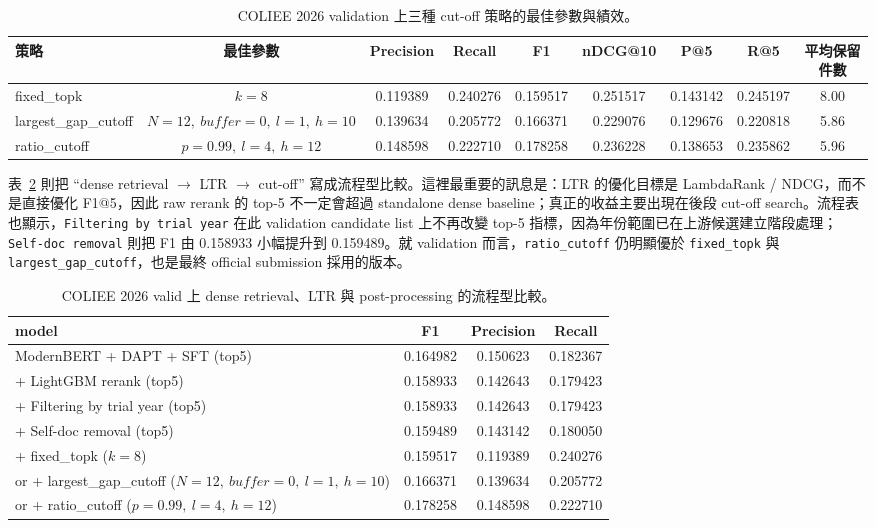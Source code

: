 \begin{table}[t]
  \centering
  \scriptsize
  \begin{tabular}{lcccccccc}
    \toprule
    策略 & 最佳參數 & Precision & Recall & F1 & nDCG@10 & P@5 & R@5 & 平均保留件數 \\
    \midrule
    fixed\_topk & $k=8$ & 0.119389 & 0.240276 & 0.159517 & 0.251517 & 0.143142 & 0.245197 & 8.00 \\
    largest\_gap\_cutoff & $N=12,\ buffer=0,\ l=1,\ h=10$ & 0.139634 & 0.205772 & 0.166371 & 0.229076 & 0.129676 & 0.220818 & 5.86 \\
    ratio\_cutoff & $p=0.99,\ l=4,\ h=12$ & 0.148598 & 0.222710 & 0.178258 & 0.236228 & 0.138653 & 0.235862 & 5.96 \\
    \bottomrule
  \end{tabular}
  \caption{COLIEE 2026 validation 上三種 cut-off 策略的最佳參數與績效。}
  \label{tab:cutoff-strategies}
\end{table}

表~\ref{tab:ltr-pipeline-progression} 則把 ``dense retrieval $\rightarrow$ LTR $\rightarrow$ cut-off'' 寫成流程型比較。這裡最重要的訊息是：LTR 的優化目標是 LambdaRank / NDCG，而不是直接優化 F1@5，因此 raw rerank 的 top-5 不一定會超過 standalone dense baseline；真正的收益主要出現在後段 cut-off search。流程表也顯示，\texttt{Filtering by trial year} 在此 validation candidate list 上不再改變 top-5 指標，因為年份範圍已在上游候選建立階段處理；\texttt{Self-doc removal} 則把 F1 由 0.158933 小幅提升到 0.159489。就 validation 而言，\texttt{ratio\_cutoff} 仍明顯優於 \texttt{fixed\_topk} 與 \texttt{largest\_gap\_cutoff}，也是最終 official submission 採用的版本。

\begin{table}[t]
  \centering
  \scriptsize
  \begin{tabular}{@{}p{}ccc@{}}
    \toprule
    model & F1 & Precision & Recall \\
    \midrule
    ModernBERT + DAPT + SFT (top5) & 0.164982 & 0.150623 & 0.182367 \\
    + LightGBM rerank (top5) & 0.158933 & 0.142643 & 0.179423 \\
    + Filtering by trial year (top5) & 0.158933 & 0.142643 & 0.179423 \\
    + Self-doc removal (top5) & 0.159489 & 0.143142 & 0.180050 \\
    + fixed\_topk ($k=8$) & 0.159517 & 0.119389 & 0.240276 \\
    \parbox[t]{0.53\columnwidth}{or + largest\_gap\_cutoff\\($N=12,\ buffer=0,\ l=1,\ h=10$)} & 0.166371 & 0.139634 & 0.205772 \\
    \parbox[t]{0.53\columnwidth}{or + ratio\_cutoff\\($p=0.99,\ l=4,\ h=12$)} & 0.178258 & 0.148598 & 0.222710 \\
    \bottomrule
  \end{tabular}
  \caption{COLIEE 2026 valid 上 dense retrieval、LTR 與 post-processing 的流程型比較。}
  \label{tab:ltr-pipeline-progression}
\end{table}

